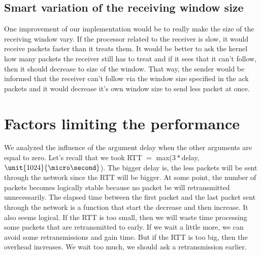 \documentclass[11pt,a4paper]{article}
\begin{document}
\subsection{Smart variation of the receiving window size}
One improvement of our implementation would be to really make the size of the receiving window vary. If the processor related to the receiver is slow, it would receive packets faster than it treats them. It would be better to ask the kernel how many packets the receiver still has to treat and if it sees that it can't follow, then it should decrease to size of the window. That way, the sender would be informed that the receiver can't follow via the window size specified in the ack packets and it would decrease it's own window size to send less packet at once. 

\section{Factors limiting the performance}

We analyzed the influence of the argument delay when the other arguments are equal to zero. Let's recall that we took RTT $=$ max($3*$delay, $\unit{1024}{\micro\second}$).  The bigger delay is, the less packets will be sent through the network since the RTT will be bigger. At some point, the number of packets becomes logically stable because no packet be will retransmitted unnecessarily. The elapsed time between the first packet and the last packet sent through the network is a function that start the decrease and then increase. It also seems logical. If the RTT is too small, then we will waste time processing some packets that are retransmitted to early. If we wait a little more, we can avoid some retransmissions and gain time. But if the RTT is too big, then the overhead increases. We wait too much, we should ask a retransmission earlier.
\end{document}
